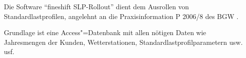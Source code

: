 Die Software "`fineshift SLP-Rollout"' dient dem Ausrollen von Standardlastprofilen, angelehnt an die Praxisinformation P 2006/8 des BGW \cite{bgwp20068}.

Grundlage ist eine Access"=Datenbank mit allen nötigen Daten wie Jahresmengen der Kunden, Wet\-ter\-sta\-tio\-nen, Standardlastprofilparametern usw. usf.